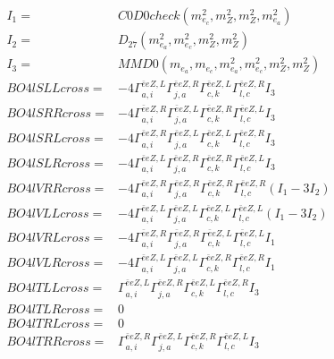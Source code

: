 \documentclass[A4,landscape]{article}
\begin{document}
\begin{align} 
I_1 = & C0D0check(m^2_{e_{{c}}}, m^2_{Z}, m^2_{Z}, m^2_{e_{{a}}}) \\ 
I_2 = & D_{27}(m^2_{e_{{a}}}, m^2_{e_{{c}}}, m^2_{Z}, m^2_{Z}) \\ 
I_3 = & MMD0(m_{e_{{a}}}, m_{e_{{c}}}, m^2_{e_{{a}}}, m^2_{e_{{c}}}, m^2_{Z}, m^2_{Z}) \\ 
  BO4lSLLcross= & -4  \Gamma^{\bar{e}e Z ,L}_{a, i} \Gamma^{\bar{e}e Z ,R}_{j, a} \Gamma^{\bar{e}e Z ,L}_{c, k} \Gamma^{\bar{e}e Z ,R}_{l, c} I_3 \\ 
  BO4lSRRcross= & -4  \Gamma^{\bar{e}e Z ,R}_{a, i} \Gamma^{\bar{e}e Z ,L}_{j, a} \Gamma^{\bar{e}e Z ,R}_{c, k} \Gamma^{\bar{e}e Z ,L}_{l, c} I_3 \\ 
  BO4lSRLcross= & -4  \Gamma^{\bar{e}e Z ,R}_{a, i} \Gamma^{\bar{e}e Z ,L}_{j, a} \Gamma^{\bar{e}e Z ,L}_{c, k} \Gamma^{\bar{e}e Z ,R}_{l, c} I_3 \\ 
  BO4lSLRcross= & -4  \Gamma^{\bar{e}e Z ,L}_{a, i} \Gamma^{\bar{e}e Z ,R}_{j, a} \Gamma^{\bar{e}e Z ,R}_{c, k} \Gamma^{\bar{e}e Z ,L}_{l, c} I_3 \\ 
  BO4lVRRcross= & -4  \Gamma^{\bar{e}e Z ,R}_{a, i} \Gamma^{\bar{e}e Z ,R}_{j, a} \Gamma^{\bar{e}e Z ,R}_{c, k} \Gamma^{\bar{e}e Z ,R}_{l, c} (I_1 - 3 I_2) \\ 
  BO4lVLLcross= & -4  \Gamma^{\bar{e}e Z ,L}_{a, i} \Gamma^{\bar{e}e Z ,L}_{j, a} \Gamma^{\bar{e}e Z ,L}_{c, k} \Gamma^{\bar{e}e Z ,L}_{l, c} (I_1 - 3 I_2) \\ 
  BO4lVRLcross= & -4  \Gamma^{\bar{e}e Z ,R}_{a, i} \Gamma^{\bar{e}e Z ,R}_{j, a} \Gamma^{\bar{e}e Z ,L}_{c, k} \Gamma^{\bar{e}e Z ,L}_{l, c} I_1 \\ 
  BO4lVLRcross= & -4  \Gamma^{\bar{e}e Z ,L}_{a, i} \Gamma^{\bar{e}e Z ,L}_{j, a} \Gamma^{\bar{e}e Z ,R}_{c, k} \Gamma^{\bar{e}e Z ,R}_{l, c} I_1 \\ 
  BO4lTLLcross= &  \Gamma^{\bar{e}e Z ,L}_{a, i} \Gamma^{\bar{e}e Z ,R}_{j, a} \Gamma^{\bar{e}e Z ,L}_{c, k} \Gamma^{\bar{e}e Z ,R}_{l, c} I_3 \\ 
  BO4lTLRcross= & 0 \\ 
  BO4lTRLcross= & 0 \\ 
  BO4lTRRcross= &  \Gamma^{\bar{e}e Z ,R}_{a, i} \Gamma^{\bar{e}e Z ,L}_{j, a} \Gamma^{\bar{e}e Z ,R}_{c, k} \Gamma^{\bar{e}e Z ,L}_{l, c} I_3 \\ 
\end{align} 
\end{document}
